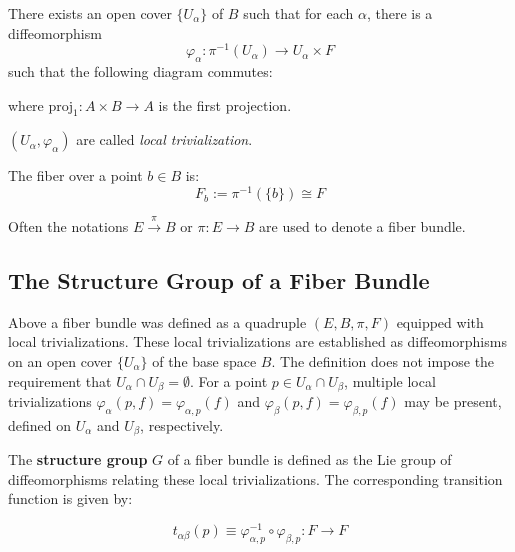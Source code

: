 There exists an open cover $\{U_\alpha\}$ of $B$ such that for each $\alpha$, there is a diffeomorphism
\[
\varphi_\alpha: \pi^{-1}(U_\alpha) \to U_\alpha \times F
\]
such that the following diagram commutes:


\begin{center}
\end{center}


where $\text{proj}_1: A \times B \to A$ is the first projection.

$(U_\alpha, \varphi_\alpha)$ are called \emph{local trivialization}.

The fiber over a point $b \in B$ is:
\[
F_b := \pi^{-1}(\{b\}) \cong F
\]

Often the notations $E \xrightarrow{\pi} B$ or $\pi : E \to B$ are used to denote a fiber bundle.


\subsection{The Structure Group of a Fiber Bundle}

Above a fiber bundle was defined as a quadruple \((E, B, \pi, F)\) equipped with local trivializations. These local trivializations are established as diffeomorphisms on an open cover $\{U_\alpha\}$ of the base space \(B\). The definition does not impose the requirement that \(U_\alpha \cap U_\beta = \emptyset\). For a point \(p \in U_\alpha \cap U_\beta\), multiple local trivializations \(\varphi_\alpha(p, f) = \varphi_{\alpha,p}(f)\) and \(\varphi_\beta(p, f) = \varphi_{\beta,p}(f)\) may be present, defined on \(U_\alpha\) and \(U_\beta\), respectively.

The \textbf{structure group} \(G\) of a fiber bundle is defined as the Lie group of diffeomorphisms relating these local trivializations. The corresponding transition function is given by\cite{NakaharaGeometrytopologyphysics2005}:

\[
t_{\alpha\beta}(p) \equiv \varphi_{\alpha,p}^{-1} \circ \varphi_{\beta,p} : F \to F
\]

